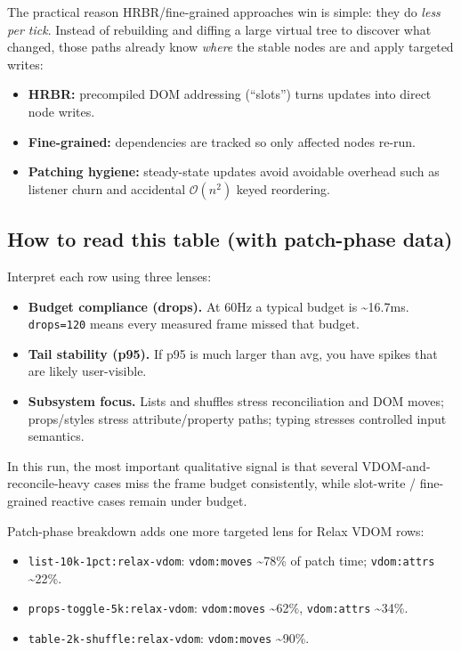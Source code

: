 The practical reason HRBR/fine-grained approaches win is simple: they do \emph{less per tick}.
Instead of rebuilding and diffing a large virtual tree to discover what changed, those paths already know \emph{where} the stable nodes are and apply targeted writes:

\begin{itemize}
\item \textbf{HRBR:} precompiled DOM addressing (``slots'') turns updates into direct node writes.
\item \textbf{Fine-grained:} dependencies are tracked so only affected nodes re-run.
\item \textbf{Patching hygiene:} steady-state updates avoid avoidable overhead such as listener churn and accidental \(\mathcal{O}(n^2)\) keyed reordering.
\end{itemize}

\subsection{How to read this table (with patch-phase data)}

Interpret each row using three lenses:

\begin{itemize}
\item \textbf{Budget compliance (drops).} At 60Hz a typical budget is \textasciitilde{}16.7ms. \texttt{drops=120} means every measured frame missed that budget.
\item \textbf{Tail stability (p95).} If p95 is much larger than avg, you have spikes that are likely user-visible.
\item \textbf{Subsystem focus.} Lists and shuffles stress reconciliation and DOM moves; props/styles stress attribute/property paths; typing stresses controlled input semantics.
\end{itemize}

In this run, the most important qualitative signal is that several VDOM-and-reconcile-heavy cases miss the frame budget consistently, while slot-write / fine-grained reactive cases remain under budget.

Patch-phase breakdown adds one more targeted lens for Relax VDOM rows:

\begin{itemize}
\item \texttt{list-10k-1pct:relax-vdom}: \texttt{vdom:moves} \textasciitilde{}78\% of patch time; \texttt{vdom:attrs} \textasciitilde{}22\%.
\item \texttt{props-toggle-5k:relax-vdom}: \texttt{vdom:moves} \textasciitilde{}62\%, \texttt{vdom:attrs} \textasciitilde{}34\%.
\item \texttt{table-2k-shuffle:relax-vdom}: \texttt{vdom:moves} \textasciitilde{}90\%.
\end{itemize}

